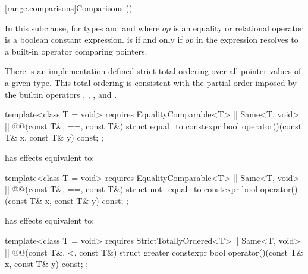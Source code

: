 {\color{addclr}
\setcounter{subsection}{7}
[range.comparisons]{Comparisons ()}

\pnum
{}

\pnum
In this subclause,  for types 
and  and where $op$ is an equality or relational
operator is a boolean constant expression.
 is  if and only if $op$
in the expression  resolves to a built-in
operator comparing pointers.

\pnum
There is an implementation-defined strict total ordering over all pointer values
of a given type. This total ordering is consistent with the partial order imposed
by the builtin operators \tcode{<}, \tcode{>}, \tcode{<=}, and \tcode{>=}.

%
\begin{itemdecl}
template<class T = void>
  requires EqualityComparable<T> || Same<T, void> || @\textit{}@(const T&, ==, const T&)
struct equal_to {
  constexpr bool operator()(const T& x, const T& y) const;
};
\end{itemdecl}

\begin{itemdescr}
\pnum
{} has effects equivalent to: 
\end{itemdescr}

%
\begin{itemdecl}
template<class T = void>
  requires EqualityComparable<T> || Same<T, void> || @\textit{}@(const T&, ==, const T&)
struct not_equal_to {
  constexpr bool operator()(const T& x, const T& y) const;
};
\end{itemdecl}

\begin{itemdescr}
\pnum
{} has effects equivalent to: 
\end{itemdescr}

%
\begin{itemdecl}
template<class T = void>
  requires StrictTotallyOrdered<T> || Same<T, void> || @\textit{}@(const T&, <, const T&)
struct greater {
  constexpr bool operator()(const T& x, const T& y) const;
};
\end{itemdecl}

}
